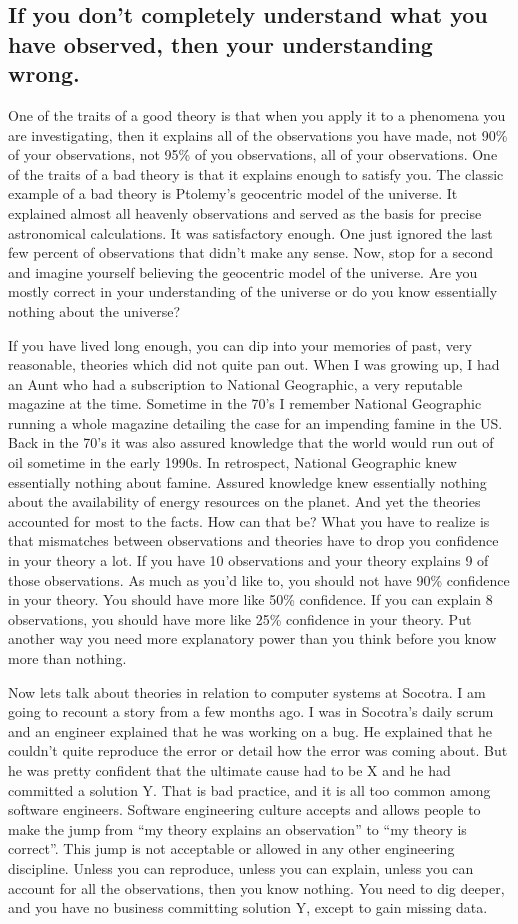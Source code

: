 \subsection{If you don't completely understand what you have observed, then your understanding wrong.}
One of the traits of a good theory is that when you apply it to a phenomena you are investigating, then it explains all of the observations you have made, not 90\%
of your observations, not 95\% of you observations, all of your observations. One of the traits of a bad theory is that it explains enough to
satisfy you. The classic example of a bad theory is Ptolemy's geocentric model of the universe. It explained almost all heavenly observations and served as the basis
for precise astronomical calculations. It was satisfactory enough. One just ignored the last few percent of observations that didn't make any sense. Now, stop for a
second and imagine yourself believing the geocentric model of the universe. Are you mostly correct in your understanding of the universe or do you know
essentially nothing about the universe?

If you have lived long enough, you can dip into your memories of past, very reasonable, theories which did not quite pan out. When I was growing up, I had an Aunt
who had a subscription to National Geographic, a very reputable magazine at the time. Sometime in the 70's I remember National Geographic running a whole magazine
detailing the case for an impending famine in the US. Back in the 70's it was also assured knowledge that the world would run out of oil sometime in the early 1990s.
In retrospect,
National Geographic knew essentially nothing about famine. Assured knowledge knew essentially nothing about the availability of energy resources on the planet. And yet
the theories accounted for most to the facts. How can that be? What you have to realize is that mismatches between observations and theories have to
drop you confidence in your theory a lot. If you have 10 observations and your theory explains 9 of those observations. As much as you'd like to,
you should not have 90\% confidence in your theory. You should have more like 50\% confidence. If you can explain 8 observations, you should have more like 25\%
confidence in your theory. Put another way you need more explanatory power than you think before you know more than nothing.

Now lets talk about theories in relation to computer systems at Socotra. I am going to recount a story from a few months ago. I was in Socotra's daily scrum and an engineer
explained that he was working on a bug. He explained that he couldn't quite reproduce the error or detail how the error was coming about. But he was pretty confident
that the ultimate cause had to be X and he had committed a solution Y. That is bad practice, and it is all too common among software engineers. Software engineering culture
accepts and allows people to make the jump from ``my theory explains an observation'' to ``my theory is correct''. This jump is not acceptable or allowed in any other
engineering discipline. Unless you can reproduce, unless you can explain, unless you can account for all the observations, then you know nothing. You need to
dig deeper, and you have no business committing solution Y, except to gain missing data.

